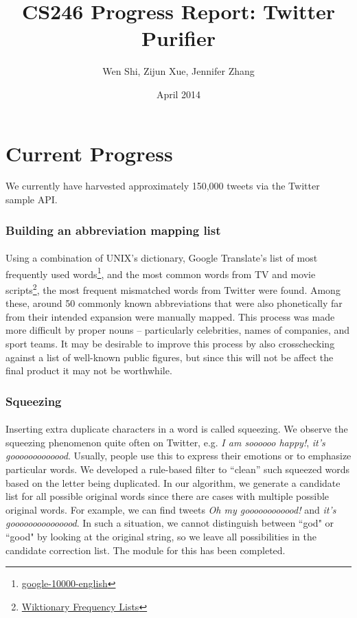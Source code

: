 \documentclass{article}
\title{CS246 Progress Report: Twitter Purifier}
\author{Wen Shi, Zijun Xue, Jennifer Zhang}
\date{April 2014}
\begin{document}
\maketitle


\section*{Current Progress}
We currently have harvested approximately 150,000 tweets via the Twitter sample API.
\subsubsection*{Building an abbreviation mapping list}
\paragraph{} Using a combination of UNIX's dictionary, Google Translate's list of most frequently used words\footnote{\href{https://github.com/first20hours/google-10000-english}{google-10000-english}}, and the most common words from TV and movie scripts\footnote{\href{http://en.wiktionary.org/wiki/Wiktionary:Frequency_lists\#TV_and_movie_scripts}{Wiktionary Frequency Lists}}, the most frequent mismatched words from Twitter were found. Among these, around 50 commonly known abbreviations that were also phonetically far from their intended expansion were manually mapped. This process was made more difficult by proper nouns -- particularly celebrities, names of companies, and sport teams. It may be desirable to improve this process by also crosschecking against a list of well-known public figures, but since this will not be affect the final product it may not be worthwhile.
\subsubsection*{Squeezing}
\paragraph{} Inserting extra duplicate characters in a word is called squeezing.
We observe the squeezing phenomenon quite often on Twitter, e.g. \textit{I am soooooo happy!}, \textit{it's gooooooooooood}. Usually, people use this to express their emotions or to emphasize particular words. We developed a rule-based filter to ``clean'' such squeezed words based on the letter being duplicated. In our algorithm, we generate a candidate list for all possible original words since there are cases with multiple possible original words. For example, we can find tweets \textit{Oh my goooooooooood!} and \textit{it's gooooooooooooood}. In such a situation, we cannot distinguish between ``god" or ``good" by looking at the original string, so we leave all possibilities in the candidate correction list. The module for this has been completed.
\end{document}
